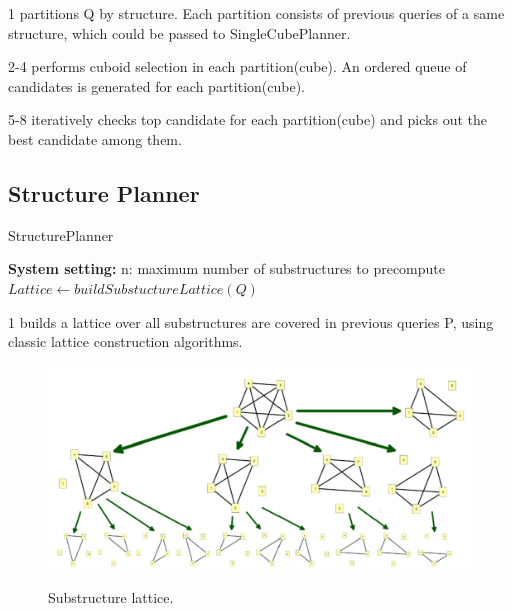 1 partitions Q by structure. Each partition consists of previous queries of a same structure, which could be passed to SingleCubePlanner.

2-4 performs cuboid selection in each partition(cube). An ordered queue of candidates is generated for each partition(cube).

5-8 iteratively checks top candidate for each partition(cube) and picks out the best candidate among them.   

\subsection{Structure Planner}

\begin{algorithm}[H]
	\caption{StructurePlanner}
	\LinesNumbered 
	\textbf{System setting:} n: maximum number of substructures to precompute\\ 
	$Lattice \leftarrow buildSubstuctureLattice(Q)$\;
	
\end{algorithm}
\clearpage

1 builds a lattice over all substructures are covered in previous queries P, using classic lattice construction algorithms.

\begin {figure}[H]
\centering
\includegraphics[scale=0.2]{pic/42.png}
\caption{Substructure lattice.}
\end{figure}


